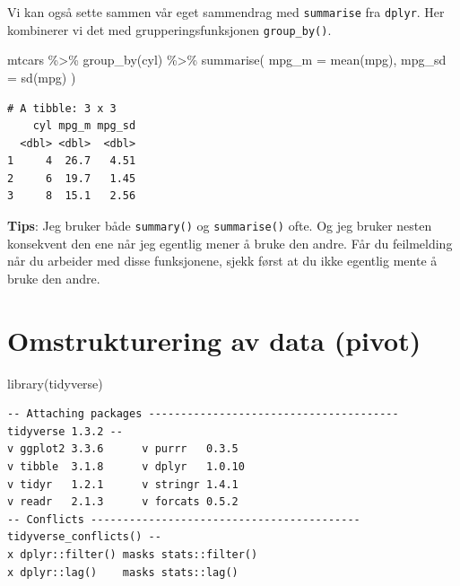 \documentclass[
  letterpaper,
  DIV=11,
  numbers=noendperiod]{scrreprt}
\newenvironment{Shaded}{\begin{snugshade}}{\end{snugshade}}
\newcommand{\AttributeTok}[1]{\textcolor[rgb]{0.40,0.45,0.13}{#1}}
\newcommand{\FunctionTok}[1]{\textcolor[rgb]{0.28,0.35,0.67}{#1}}
\newcommand{\NormalTok}[1]{\textcolor[rgb]{0.00,0.23,0.31}{#1}}
\newcommand{\SpecialCharTok}[1]{\textcolor[rgb]{0.37,0.37,0.37}{#1}}
\begin{document}
Vi kan også sette sammen vår eget sammendrag med \texttt{summarise} fra
\texttt{dplyr}. Her kombinerer vi det med grupperingsfunksjonen
\texttt{group\_by()}.

\begin{Shaded}
\begin{Highlighting}[]
\NormalTok{mtcars }\SpecialCharTok{\%\textgreater{}\%} 
  \FunctionTok{group\_by}\NormalTok{(cyl) }\SpecialCharTok{\%\textgreater{}\%} 
  \FunctionTok{summarise}\NormalTok{(}
    \AttributeTok{mpg\_m =} \FunctionTok{mean}\NormalTok{(mpg),}
    \AttributeTok{mpg\_sd =} \FunctionTok{sd}\NormalTok{(mpg)}
\NormalTok{  )}
\end{Highlighting}
\end{Shaded}

\begin{verbatim}
# A tibble: 3 x 3
    cyl mpg_m mpg_sd
  <dbl> <dbl>  <dbl>
1     4  26.7   4.51
2     6  19.7   1.45
3     8  15.1   2.56
\end{verbatim}

\textbf{Tips}: Jeg bruker både \texttt{summary()} og
\texttt{summarise()} ofte. Og jeg bruker nesten konsekvent den ene når
jeg egentlig mener å bruke den andre. Får du feilmelding når du arbeider
med disse funksjonene, sjekk først at du ikke egentlig mente å bruke den
andre.


\hypertarget{omstrukturering-av-data-pivot}{%
\chapter{Omstrukturering av data
(pivot)}\label{omstrukturering-av-data-pivot}}

\begin{Shaded}
\begin{Highlighting}[]
\FunctionTok{library}\NormalTok{(tidyverse)}
\end{Highlighting}
\end{Shaded}

\begin{verbatim}
-- Attaching packages --------------------------------------- tidyverse 1.3.2 --
v ggplot2 3.3.6      v purrr   0.3.5 
v tibble  3.1.8      v dplyr   1.0.10
v tidyr   1.2.1      v stringr 1.4.1 
v readr   2.1.3      v forcats 0.5.2 
-- Conflicts ------------------------------------------ tidyverse_conflicts() --
x dplyr::filter() masks stats::filter()
x dplyr::lag()    masks stats::lag()
\end{verbatim}
\end{document}
